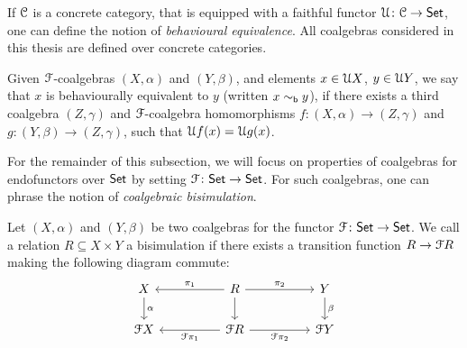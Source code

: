 If $\mathcal{C}$ is a concrete category, that is equipped with a faithful functor $\mathcal{U} \colon \mathcal{C} \to {\mathsf{Set}}$, one can define the notion of \emph{behavioural equivalence}. All coalgebras considered in this thesis are defined over concrete categories.
\begin{definition}\label{c2:def:behavioural_equivalence}
Given $\mathcal{F}$-coalgebras $(X, \alpha)$ and $(Y, \beta)$, and elements $x \in \mathcal{U} X$, $y \in \mathcal{U} Y$, we say that $x$ is behaviourally equivalent to $y$ (written $x \sim_{\mathsf{b}} y$), if there exists a third coalgebra $(Z, \gamma)$ and $\mathcal{F}$-coalgebra homomorphisms $f \colon (X, \alpha) \to (Z, \gamma)$ and $g \colon (Y, \beta) \to (Z, \gamma)$, such that $\mathcal{U} f(x)=\mathcal{U} g(x)$.	
\end{definition}


For the remainder of this subsection, we will focus on properties of coalgebras for endofunctors over ${\mathsf{Set}}$ by setting $\mathcal{F} \colon {\mathsf{Set}} \to {\mathsf{Set}}$. For such coalgebras, one can phrase the notion of \emph{coalgebraic bisimulation}.
\begin{definition}\label{c2:def:bisimulation}
Let $(X, \alpha)$ and $(Y, \beta)$ be two coalgebras for the functor $\mathcal{F} \colon {\mathsf{Set}} \to {\mathsf{Set}}$. We call a relation ${R} \subseteq {X \times Y}$ a bisimulation if there exists a transition function $R \to \mathcal{F} R$ making the following diagram commute:
\[\begin{tikzcd}
	X && R && Y \\
	{\funF X} && {\funF R} && {\funF Y}
	\arrow["\alpha", from=1-1, to=2-1]
	\arrow["{\pi_1}"', from=1-3, to=1-1]
	\arrow["{\pi_2}", from=1-3, to=1-5]
	\arrow[from=1-3, to=2-3]
	\arrow["\beta", from=1-5, to=2-5]
	\arrow["{\funF \pi_1}", from=2-3, to=2-1]
	\arrow["{\funF \pi_2}"', from=2-3, to=2-5]
\end{tikzcd}\]	
\end{definition}

